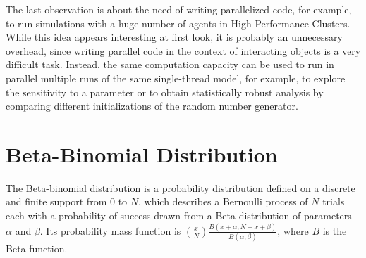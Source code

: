 \documentclass[a4paper, headings=standardclasses]{scrartcl}
\begin{document}
The last observation is about the need of writing parallelized code, for example, to run simulations with a huge number of agents in High-Performance Clusters. While this idea appears interesting at first look, it is probably an unnecessary overhead, since writing parallel code in the context of interacting objects is a very difficult task.
Instead, the same computation capacity can be used to run in parallel multiple runs of the same single-thread model, for example, to explore the sensitivity to a parameter or to obtain statistically robust analysis by comparing different initializations of the random number generator.






\printbibliography

\clearpage

\appendix

\section{Beta-Binomial Distribution}
\label{sec:beta-binomial}
The Beta-binomial distribution is a probability distribution defined on a discrete and finite support from $0$ to $N$, which describes a Bernoulli process of $N$ trials each with a probability of success drawn from a Beta distribution of parameters $\alpha$ and $\beta$.
Its probability mass function is $\binom{x}{N}\frac{B(x+\alpha, N-x+\beta)}{B(\alpha,\beta)}$, where $B$ is the Beta function.
\end{document}
